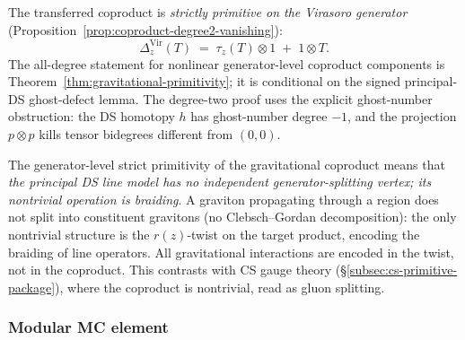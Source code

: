 The transferred coproduct is \emph{strictly primitive on the
Virasoro generator} (Proposition~\ref{prop:coproduct-degree2-vanishing}):
\begin{equation}\label{eq:grav-coproduct-primitive}
\Delta_z^{\mathrm{Vir}}(T)
\;=\;
\tau_z(T) \otimes 1 \;+\; 1 \otimes T.
\end{equation}
The all-degree statement for nonlinear generator-level coproduct
components is Theorem~\ref{thm:gravitational-primitivity}; it is
conditional on the signed principal-DS ghost-defect lemma.  The
degree-two proof uses the explicit ghost-number obstruction: the DS
homotopy \(h\) has ghost-number degree \(-1\), and the projection
\(p\otimes p\) kills tensor bidegrees different from \((0,0)\).

The generator-level strict primitivity of the gravitational coproduct
means that \emph{the principal DS line model has no independent
generator-splitting vertex; its nontrivial operation is braiding}.
A graviton propagating through a region does not
split into constituent gravitons (no Clebsch--Gordan decomposition):
the only nontrivial structure is the $r(z)$-twist on the
target product, encoding the braiding of line operators.
All gravitational interactions are encoded in the twist,
not in the coproduct.
This contrasts with CS gauge theory
(\S\ref{subsec:cs-primitive-package}), where the coproduct
is nontrivial, read as gluon splitting.

\subsubsection*{Modular MC element}

